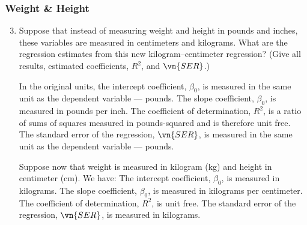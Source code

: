 \begin{frame}
\frametitle{Weight \& Height}
\ask 

\begin{enumerate}\setcounter{enumi}{2}

\item Suppose that instead of measuring weight and height in pounds and inches, these variables are measured in centimeters and kilograms. What are the regression estimates from this new kilogram–centimeter regression? (Give all results, estimated coefficients, $R^{2}$, and $\vn{SER}$.)

\begin{answer}
In the original units, the intercept coefficient, $\beta_{0}$, is measured in the same unit as the dependent variable --- pounds. The slope coefficient, $\beta_{0}$, is measured in pounds per inch. The coefficient of determination, $R^{2}$, is a ratio of sums of squares measured in pounds-squared and is therefore unit free. The standard error of the regression, $\vn{SER}$, is measured in the same unit as the dependent variable --- pounds. 

\medskip

Suppose now that weight is measured in kilogram (kg) and height in centimeter (cm). We have:
The intercept coefficient, $\beta_{0}$, is measured in kilograms. 
The slope coefficient, $\beta_{0}$, is measured in kilograms per centimeter. 
The coefficient of determination, $R^{2}$, is unit free. 
The standard error of the regression, $\vn{SER}$, is measured in kilograms. 
\end{answer}

\end{enumerate}
\end{frame}


